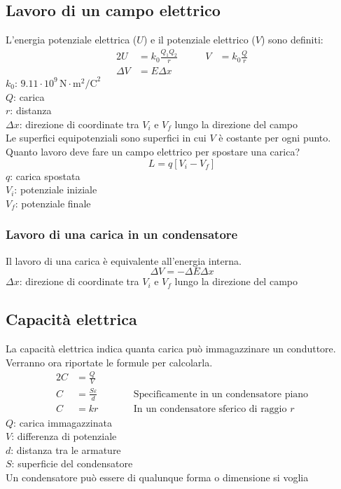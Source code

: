 \subsection{Lavoro di un campo elettrico}
L'energia potenziale elettrica ($U$) e il potenziale elettrico ($V$) sono definiti:
\begin{alignat*}{2}
  U &= k_0\frac{Q_1Q_2}{r} &\qquad V &= k_0\frac{Q}{r}\\
  \Delta V &= E\Delta x &&
\end{alignat*}
\hyperref[tab:k0]{$k_0$}: $9.11\cdot10^9\,\text{N}\cdot\text{m}^2\text{/C}^2$\\
$Q$: carica\\
$r$: distanza\\
$\Delta x$: direzione di coordinate tra $V_i$ e $V_f$ lungo la direzione del campo\\[\baselineskip]
Le superfici equipotenziali sono superfici in cui $V$ è costante per ogni punto.\\[\baselineskip]
Quanto lavoro deve fare un campo elettrico per spostare una carica?
\begin{equation*}
  L = q\left[V_i - V_f\right]
\end{equation*}
$q$: carica spostata\\
$V_i$: potenziale iniziale\\
$V_f$: potenziale finale

\subsubsection{Lavoro di una carica in un condensatore}
Il lavoro di una carica è equivalente all'energia interna.
\begin{equation*}
  \Delta V = -\Delta E\Delta x
\end{equation*}
$\Delta x$: direzione di coordinate tra $V_i$ e $V_f$ lungo la direzione del campo

\subsection{Capacità elettrica}\label{sub:elettrostatica:capacita}
La capacità elettrica indica quanta carica può immagazzinare un conduttore. Verranno ora 
riportate le formule per calcolarla.
\begin{alignat*}{2}
  C &= \frac{Q}{V} &\qquad &\\
  C &= \frac{S\varepsilon}{d} & &\text{Specificamente in un condensatore piano}\\
  C &= kr & &\text{In un condensatore sferico di raggio } r
\end{alignat*}
$Q$: carica immagazzinata\\
$V$: differenza di potenziale\\ 
$d$: distanza tra le armature\\
$S$: superficie del condensatore\\[\baselineskip]
Un condensatore può essere di qualunque forma o dimensione si voglia


